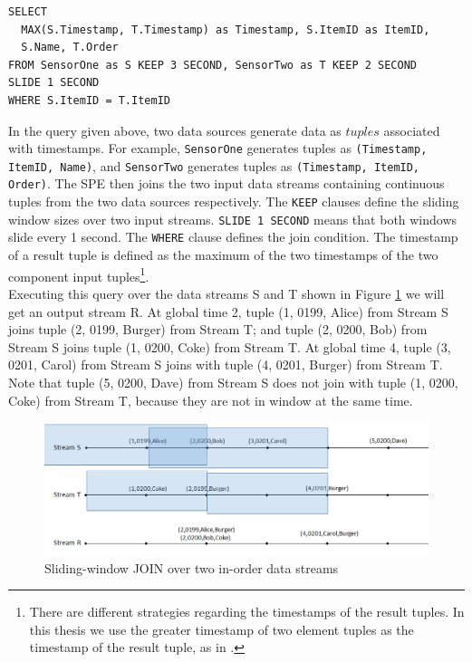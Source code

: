 \documentclass[a4paper, 11pt, twoside]{report}
\begin{document}
\begin{verbatim}
SELECT 
  MAX(S.Timestamp, T.Timestamp) as Timestamp, S.ItemID as ItemID,
  S.Name, T.Order
FROM SensorOne as S KEEP 3 SECOND, SensorTwo as T KEEP 2 SECOND
SLIDE 1 SECOND
WHERE S.ItemID = T.ItemID
\end{verbatim}

In the query given above, two data sources generate data as $tuples$ associated with timestamps. For example, \texttt{SensorOne} generates tuples as \texttt{(Timestamp, ItemID, Name)}, and \texttt{SensorTwo} generates tuples as \texttt{(Timestamp, ItemID, Order)}. The SPE then joins the two input data streams containing continuous tuples from the two data sources respectively. The \texttt{KEEP} clauses define the sliding window sizes over two input streams. \texttt{SLIDE 1 SECOND} means that both windows slide every 1 second. The \texttt{WHERE} clause defines the join condition. The timestamp of a result tuple is defined as the maximum of the two timestamps of the two component input tuples\footnote{There are different strategies regarding the timestamps of the result tuples. In this thesis we use the greater timestamp of two element tuples as the timestamp of the result tuple, as in \cite{ayad2004static}.}.\\

Executing this query over the data streams S and T shown in Figure \ref{fig:intro-example} we will get an output stream R. At global time 2, tuple (1, 0199, Alice) from Stream S joins tuple (2, 0199, Burger) from Stream T; and tuple (2, 0200, Bob) from Stream S joins tuple (1, 0200, Coke) from Stream T. At global time 4, tuple (3, 0201, Carol) from Stream S joins with tuple (4, 0201, Burger) from Stream T. Note that tuple (5, 0200, Dave) from Stream S does not join with tuple (1, 0200, Coke) from Stream T, because they are not in window at the same time.\\

\begin{figure}[h]
\centering
\includegraphics[width=5in]{intro-example}
\caption{Sliding-window JOIN over two in-order data streams \label{fig:intro-example}}
\end{figure}
\end{document}

